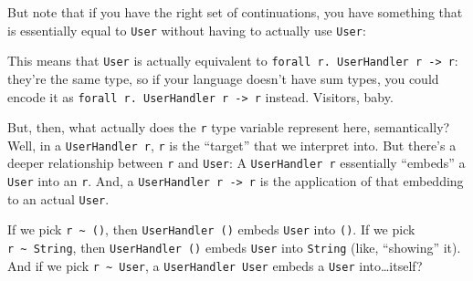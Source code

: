 \documentclass[]{article}
\newenvironment{Shaded}{}{}
\newcommand{\DataTypeTok}[1]{\textcolor[rgb]{0.56,0.13,0.00}{#1}}
\newcommand{\KeywordTok}[1]{\textcolor[rgb]{0.00,0.44,0.13}{\textbf{#1}}}
\newcommand{\NormalTok}[1]{#1}
\newcommand{\OperatorTok}[1]{\textcolor[rgb]{0.40,0.40,0.40}{#1}}
\newcommand{\OtherTok}[1]{\textcolor[rgb]{0.00,0.44,0.13}{#1}}
\begin{document}
But note that if you have the right set of continuations, you have something
that is essentially equal to \texttt{User} without having to actually use
\texttt{User}:

\begin{Shaded}
\end{Shaded}

This means that \texttt{User} is actually equivalent to
\texttt{forall\ r.\ UserHandler\ r\ -\textgreater{}\ r}: they're the same type,
so if your language doesn't have sum types, you could encode it as
\texttt{forall\ r.\ UserHandler\ r\ -\textgreater{}\ r} instead. Visitors, baby.

But, then, what actually does the \texttt{r} type variable represent here,
semantically? Well, in a \texttt{UserHandler\ r}, \texttt{r} is the ``target''
that we interpret into. But there's a deeper relationship between \texttt{r} and
\texttt{User}: A \texttt{UserHandler\ r} essentially ``embeds'' a \texttt{User}
into an \texttt{r}. And, a \texttt{UserHandler\ r\ -\textgreater{}\ r} is the
application of that embedding to an actual \texttt{User}.

If we pick \texttt{r\ \textasciitilde{}\ ()}, then \texttt{UserHandler\ ()}
embeds \texttt{User} into \texttt{()}. If we pick
\texttt{r\ \textasciitilde{}\ String}, then \texttt{UserHandler\ ()} embeds
\texttt{User} into \texttt{String} (like, ``showing'' it). And if we pick
\texttt{r\ \textasciitilde{}\ User}, a \texttt{UserHandler\ User} embeds a
\texttt{User} into\ldots itself?
\end{document}
